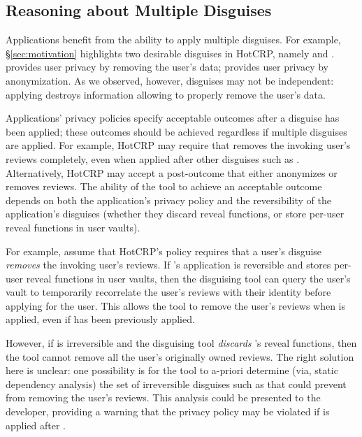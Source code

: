\subsection{Reasoning about Multiple Disguises}
\label{sec:composition}

Applications benefit from the ability to apply multiple disguises. For example,
\S\ref{sec:motivation} highlights two desirable disguises in HotCRP, namely \gdpr and \ca. \gdpr
provides user privacy by removing the user's data; \ca provides user privacy by anonymization.  As
we observed, however, disguises may not be independent: applying \ca destroys information allowing
\gdpr to properly remove the user's data.

Applications' privacy policies specify acceptable outcomes after a disguise has been
applied; these outcomes should be achieved regardless if multiple disguises are applied.
For example, HotCRP may require that \gdpr removes the invoking user's reviews completely, even when
applied after other disguises such as \ca.  Alternatively, HotCRP may accept a post-\gdpr outcome that either
anonymizes or removes reviews. 
The ability of the tool to achieve an acceptable outcome depends on both the application's privacy
policy and the reversibility of the application's disguises (\ie whether they discard reveal functions, or store
per-user reveal functions in user vaults).

For example, assume that HotCRP's policy requires that a user's \gdpr disguise \emph{removes} the
invoking user's reviews. If \ca's application is reversible and stores per-user reveal functions in
user vaults, then the disguising tool can query the user's vault to temporarily recorrelate the
user's reviews with their identity before applying \gdpr for the user. This allows the tool to
remove the user's reviews when \gdpr is applied, even if \ca has been previously applied.
%

However, if \ca is irreversible and the disguising tool \emph{discards} \ca's reveal functions, then
the tool cannot remove all the user's originally owned reviews.  The right solution here is unclear:
one possibility is for the tool to a-priori determine (via, \eg static dependency analysis) the set
of irreversible disguises such as \ca that could prevent \gdpr from removing the user's reviews.
This analysis could be presented to the developer, providing a warning that the privacy policy may
be violated if \gdpr is applied after \ca.

